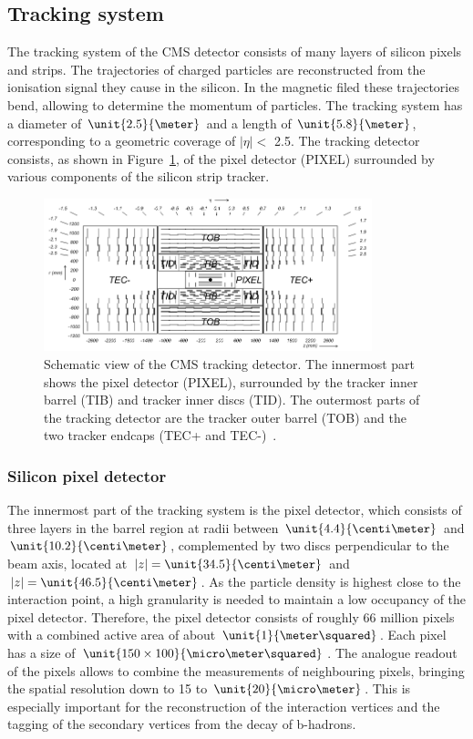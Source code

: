 \subsection{Tracking system}
The tracking system of the CMS detector consists of many layers of silicon pixels and strips. The trajectories of charged particles are reconstructed from the ionisation signal they cause in the silicon. In the magnetic filed these trajectories bend, allowing to determine the momentum of particles. The tracking system has a diameter of $\unit{2.5}{\meter}$ and a length of $\unit{5.8}{\meter}$, corresponding to a geometric coverage of $\vert \eta \vert < $ 2.5. The tracking detector consists, as shown in Figure~\ref{fig:tracker}, of the pixel detector (PIXEL) surrounded by various components of  the silicon strip tracker. 
\begin{figure}[htbp]
\centering
  \includegraphics[width=0.85\textwidth]{plots/CMS/Tracker.png}
\caption{Schematic view of the CMS tracking detector. The innermost part shows the pixel detector (PIXEL), surrounded by the tracker inner barrel (TIB) and tracker inner discs (TID). The outermost parts of the tracking detector are the tracker outer barrel (TOB) and the two tracker endcaps (TEC+ and TEC-)~\cite{CMS}.}
\label{fig:tracker}
\end{figure} 
\subsubsection*{Silicon pixel detector}
The innermost part of the tracking system is the pixel detector, which consists of three layers in the barrel region at radii between $\unit{4.4}{\centi\meter}$ and $\unit{10.2}{\centi\meter}$, complemented by two discs perpendicular to the beam axis, located at $\vert z \vert = \unit{34.5}{\centi\meter}$ and  $\vert z \vert = \unit{46.5}{\centi\meter}$. As the particle density is highest close to the interaction point, a high granularity is needed to maintain a low occupancy of the pixel detector. Therefore, the pixel detector consists of roughly 66 million pixels with a combined active area of about $\unit{1}{\meter\squared}$. Each pixel has a size of $\unit{150\times100}{\micro\meter\squared}$. The analogue readout of the pixels allows to combine the measurements of neighbouring pixels, bringing the spatial resolution down to 15 to $\unit{20}{\micro\meter}$. This is especially important for the reconstruction of the interaction vertices and the tagging of the secondary vertices from the decay of b-hadrons.
